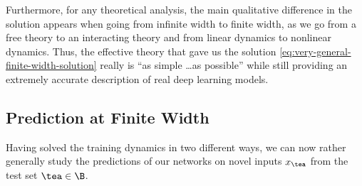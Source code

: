 Furthermore, for any theoretical analysis, the main qualitative difference in the solution appears when going from infinite width to finite width, as we go from a free theory to an interacting theory and from linear dynamics to nonlinear dynamics. Thus, the effective theory that gave us the solution \eqref{eq:very-general-finite-width-solution} really is ``as simple \ldots as possible'' while still providing an extremely accurate description of real deep learning models.

































\subsection{Prediction at Finite Width}\label{subsec:prediction-at-finite-width}


Having solved the training dynamics in two different ways, we can now rather generally study the predictions of our networks on novel inputs $x_{\tea}$ from the test set $\tea \in \B$. 

